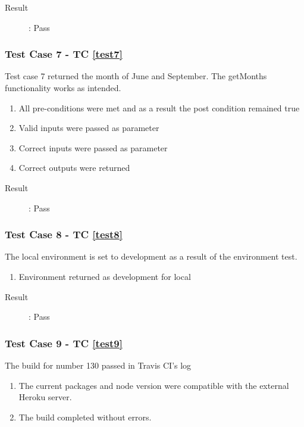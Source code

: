 \documentclass{article}
\begin{document}
\begin{description}
	\item [Result]: Pass 
\end{description}

\subsubsection{Test Case 7 - TC \ref{test7}}
Test case 7 returned the month of June and September. 
The getMonths functionality works as intended.
\begin{enumerate}
	\item All pre-conditions were met and as a result the post condition remained true
	\item Valid inputs were passed as parameter 
	\item Correct inputs were passed as parameter 
	\item Correct outputs were returned
\end{enumerate}

\begin{description}
	\item [Result]: Pass 
\end{description}

\subsubsection{Test Case 8 - TC \ref{test8}}
The local environment is set to development as a result of the environment test.
\begin{enumerate}
	\item Environment returned as development for local
\end{enumerate}

\begin{description}
	\item [Result]: Pass 
\end{description}

\subsubsection{Test Case 9 - TC \ref{test9}}
The build for number 130 passed in Travis CI's log
\begin{enumerate}
	\item The current packages and node version were compatible with the external Heroku server.
	\item The build completed without errors.
\end{enumerate}
\end{document}
